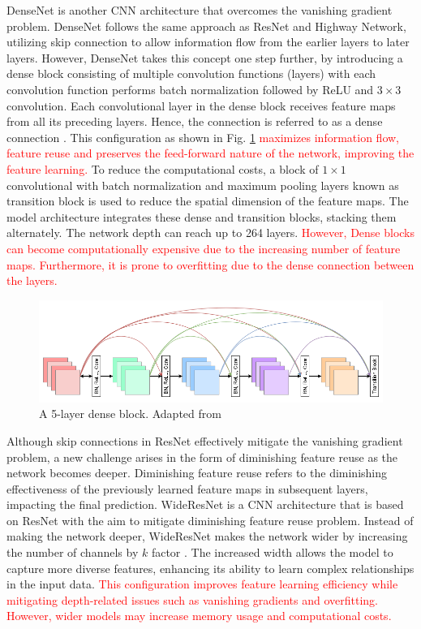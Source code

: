 \documentclass[preprint,12pt]{elsarticle}
\begin{document}
DenseNet is another CNN architecture that overcomes the vanishing gradient problem. DenseNet follows the same approach as ResNet and Highway Network, utilizing skip connection to allow information flow from the earlier layers to later layers. However, DenseNet takes this concept one step further, by introducing a dense block consisting of multiple convolution functions (layers) with each convolution function performs batch normalization followed by ReLU and $3 \times 3$ convolution. Each convolutional layer in the dense block receives feature maps from all its preceding layers. Hence, the connection is referred to as a dense connection \citep{huang_densely_2017}. This configuration as shown in Fig. \ref{fig_deep_sv_learning_cnn_densenet} \textcolor{red} {maximizes information flow, feature reuse and preserves the feed-forward nature of the network, improving the feature learning.} To reduce the computational costs, a block of $1 \times 1$ convolutional with batch normalization and maximum pooling layers known as transition block is used to reduce the spatial dimension of the feature maps. The model architecture integrates these dense and transition blocks, stacking them alternately. The network depth can reach up to 264 layers. \textcolor{red}{However, Dense blocks can become computationally expensive due to the increasing number of feature maps. Furthermore, it is prone to overfitting due to the dense connection between the layers.} 

\begin{figure}[h!]
    \centering
    \includegraphics[scale=0.45]{fig_deep_sv_learning_cnn_densenet.png}
    \caption{A 5-layer dense block. Adapted from \citep{huang_densely_2017}}
    \label{fig_deep_sv_learning_cnn_densenet}
\end{figure}

Although skip connections in ResNet effectively mitigate the vanishing gradient problem, a new challenge arises in the form of diminishing feature reuse as the network becomes deeper. Diminishing feature reuse refers to the diminishing effectiveness of the previously learned feature maps in subsequent layers, impacting the final prediction. WideResNet is a CNN architecture that is based on ResNet with the aim to mitigate diminishing feature reuse problem. Instead of making the network deeper, WideResNet makes the network wider by increasing the number of channels by $k$ factor \citep{zagoruyko_wide_2017}. The increased width allows the model to capture more diverse features, enhancing its ability to learn complex relationships in the input data. \textcolor{red}{This configuration improves feature learning efficiency while mitigating depth-related issues such as vanishing gradients and overfitting. However, wider models may increase memory usage and computational costs.}
\end{document}
